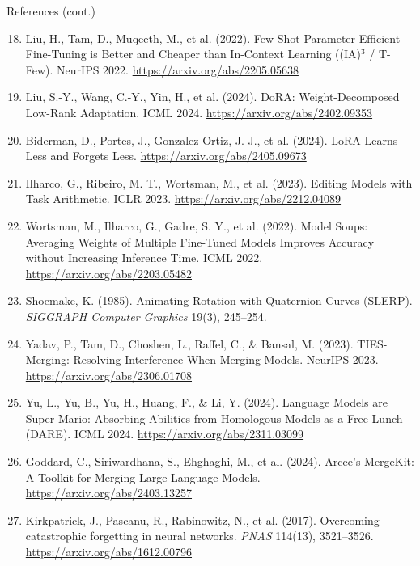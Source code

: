 \begin{frame}[allowframebreaks]{References (cont.)}
  \scriptsize
  \begin{enumerate}
    \setcounter{enumi}{17}
    \item Liu, H., Tam, D., Muqeeth, M., et al. (2022). Few-Shot Parameter-Efficient Fine-Tuning is Better and Cheaper than In-Context Learning ((IA)$^3$ / T-Few). NeurIPS 2022. \href{https://arxiv.org/abs/2205.05638}{https://arxiv.org/abs/2205.05638}
    \item Liu, S.-Y., Wang, C.-Y., Yin, H., et al. (2024). DoRA: Weight-Decomposed Low-Rank Adaptation. ICML 2024. \href{https://arxiv.org/abs/2402.09353}{https://arxiv.org/abs/2402.09353}
    \item Biderman, D., Portes, J., Gonzalez Ortiz, J. J., et al. (2024). LoRA Learns Less and Forgets Less. \href{https://arxiv.org/abs/2405.09673}{https://arxiv.org/abs/2405.09673}
    \item Ilharco, G., Ribeiro, M. T., Wortsman, M., et al. (2023). Editing Models with Task Arithmetic. ICLR 2023. \href{https://arxiv.org/abs/2212.04089}{https://arxiv.org/abs/2212.04089}
    \item Wortsman, M., Ilharco, G., Gadre, S. Y., et al. (2022). Model Soups: Averaging Weights of Multiple Fine-Tuned Models Improves Accuracy without Increasing Inference Time. ICML 2022. \href{https://arxiv.org/abs/2203.05482}{https://arxiv.org/abs/2203.05482}
    \item Shoemake, K. (1985). Animating Rotation with Quaternion Curves (SLERP). \textit{SIGGRAPH Computer Graphics} 19(3), 245--254.
    \item Yadav, P., Tam, D., Choshen, L., Raffel, C., \& Bansal, M. (2023). TIES-Merging: Resolving Interference When Merging Models. NeurIPS 2023. \href{https://arxiv.org/abs/2306.01708}{https://arxiv.org/abs/2306.01708}
    \item Yu, L., Yu, B., Yu, H., Huang, F., \& Li, Y. (2024). Language Models are Super Mario: Absorbing Abilities from Homologous Models as a Free Lunch (DARE). ICML 2024. \href{https://arxiv.org/abs/2311.03099}{https://arxiv.org/abs/2311.03099}
    \item Goddard, C., Siriwardhana, S., Ehghaghi, M., et al. (2024). Arcee's MergeKit: A Toolkit for Merging Large Language Models. \href{https://arxiv.org/abs/2403.13257}{https://arxiv.org/abs/2403.13257}
    \item Kirkpatrick, J., Pascanu, R., Rabinowitz, N., et al. (2017). Overcoming catastrophic forgetting in neural networks. \textit{PNAS} 114(13), 3521--3526. \href{https://arxiv.org/abs/1612.00796}{https://arxiv.org/abs/1612.00796}

\end{enumerate}
\end{frame}
